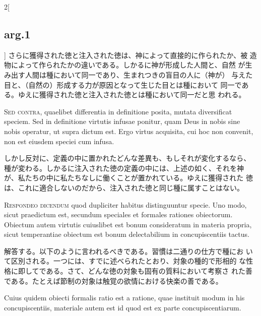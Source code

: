 \documentclass[paper=a4paper,fontsize=10pt,jafontsize=9pt,titlepage]{jlreq}
\begin{document}
\begin{paracol}{2}[\subsection{arg.1}]
さらに獲得された徳と注入された徳は、神によって直接的に作られたか、被
 造物によって作られたかの違いである。しかるに神が形成した人間と、自然
 が生み出す人間は種において同一であり、生まれつきの盲目の人に（神が）
 与えた目と、（自然の）形成する力が原因となって生じた目とは種において
 同一である。ゆえに獲得された徳と注入された徳とは種において同一だと思
 われる。

\switchcolumn*[\subsection{s.c.}]

{\scshape Sed contra}, quaelibet differentia in definitione posita,
mutata diversificat speciem. Sed in definitione virtutis infusae
ponitur, quam Deus in nobis sine nobis operatur, ut supra dictum
est. Ergo virtus acquisita, cui hoc non convenit, non est eiusdem
speciei cum infusa.

\switchcolumn

しかし反対に、定義の中に置かれたどんな差異も、もしそれが変化するなら、
 種が変わる。しかるに注入された徳の定義の中には、上述の如く、それを神
 が、私たちの中に私たちなしに働くことが置かれている。ゆえに獲得された
 徳は、これに適合しないのだから、注入された徳と同じ種に属すことはない。


{\scshape Respondeo dicendum} quod dupliciter habitus distinguuntur
specie. Uno modo, sicut praedictum est, secundum speciales et formales
rationes obiectorum. Obiectum autem virtutis cuiuslibet est bonum
consideratum in materia propria, sicut temperantiae obiectum est bonum
delectabilium in concupiscentiis tactus.

\switchcolumn

解答する。以下のように言われるべきである。習慣は二通りの仕方で種にお
 いて区別される。一つには、すでに述べられたとおり、対象の種的で形相的
 な性格に即してである。さて、どんな徳の対象も固有の質料において考察さ
 れた善である。たとえば節制の対象は触覚の欲情における快楽の善である。

\switchcolumn*

Cuius quidem obiecti formalis ratio est a ratione, quae instituit
modum in his concupiscentiis, materiale autem est id quod est ex parte
 concupiscentiarum.

\switchcolumn


\end{paracol}
\end{document}

